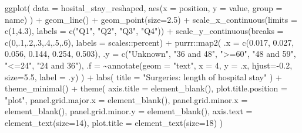 \documentclass[
  letterpaper,
  DIV=11,
  numbers=noendperiod]{scrartcl}
\newenvironment{Shaded}{\begin{snugshade}}{\end{snugshade}}
\newcommand{\AttributeTok}[1]{\textcolor[rgb]{0.40,0.45,0.13}{#1}}
\newcommand{\DecValTok}[1]{\textcolor[rgb]{0.68,0.00,0.00}{#1}}
\newcommand{\FloatTok}[1]{\textcolor[rgb]{0.68,0.00,0.00}{#1}}
\newcommand{\FunctionTok}[1]{\textcolor[rgb]{0.28,0.35,0.67}{#1}}
\newcommand{\NormalTok}[1]{\textcolor[rgb]{0.00,0.23,0.31}{#1}}
\newcommand{\SpecialCharTok}[1]{\textcolor[rgb]{0.37,0.37,0.37}{#1}}
\newcommand{\StringTok}[1]{\textcolor[rgb]{0.13,0.47,0.30}{#1}}
\begin{document}
\begin{Shaded}
\begin{Highlighting}[]
\FunctionTok{ggplot}\NormalTok{(}
  \AttributeTok{data =}\NormalTok{ hosital\_stay\_reshaped,}
  \FunctionTok{aes}\NormalTok{(}\AttributeTok{x =}\NormalTok{ position, }\AttributeTok{y =}\NormalTok{ value, }\AttributeTok{group =}\NormalTok{ name)}
\NormalTok{) }\SpecialCharTok{+}
  \FunctionTok{geom\_line}\NormalTok{() }\SpecialCharTok{+}
  \FunctionTok{geom\_point}\NormalTok{(}\AttributeTok{size=}\FloatTok{2.5}\NormalTok{) }\SpecialCharTok{+}
  \FunctionTok{scale\_x\_continuous}\NormalTok{(}\AttributeTok{limits =} \FunctionTok{c}\NormalTok{(}\DecValTok{1}\NormalTok{,}\FloatTok{4.3}\NormalTok{), }\AttributeTok{labels =} \FunctionTok{c}\NormalTok{(}\StringTok{"Q1"}\NormalTok{, }\StringTok{"Q2"}\NormalTok{, }\StringTok{"Q3"}\NormalTok{, }\StringTok{"Q4"}\NormalTok{)) }\SpecialCharTok{+}
  \FunctionTok{scale\_y\_continuous}\NormalTok{(}\AttributeTok{breaks =} \FunctionTok{c}\NormalTok{(}\DecValTok{0}\NormalTok{,.}\DecValTok{1}\NormalTok{,.}\DecValTok{2}\NormalTok{,.}\DecValTok{3}\NormalTok{,.}\DecValTok{4}\NormalTok{,.}\DecValTok{5}\NormalTok{,.}\DecValTok{6}\NormalTok{), }\AttributeTok{labels =}\NormalTok{ scales}\SpecialCharTok{::}\NormalTok{percent) }\SpecialCharTok{+}
\NormalTok{  purrr}\SpecialCharTok{::}\FunctionTok{map2}\NormalTok{(}
    \AttributeTok{.x =} \FunctionTok{c}\NormalTok{(}\FloatTok{0.017}\NormalTok{, }\FloatTok{0.027}\NormalTok{, }\FloatTok{0.056}\NormalTok{, }\FloatTok{0.144}\NormalTok{, }\FloatTok{0.254}\NormalTok{, }\FloatTok{0.503}\NormalTok{),}
    \AttributeTok{.y =} \FunctionTok{c}\NormalTok{(}\StringTok{"Unknown"}\NormalTok{, }\StringTok{"36 and 48"}\NormalTok{, }\StringTok{"\textgreater{}=60"}\NormalTok{, }\StringTok{"48 and 59"}\NormalTok{, }\StringTok{"\textless{}=24"}\NormalTok{, }\StringTok{"24 and 36"}\NormalTok{),}
    \AttributeTok{.f =} \SpecialCharTok{\textasciitilde{}}\FunctionTok{annotate}\NormalTok{(}\AttributeTok{geom =} \StringTok{"text"}\NormalTok{, }\AttributeTok{x =} \DecValTok{4}\NormalTok{, }\AttributeTok{y =}\NormalTok{ .x, }\AttributeTok{hjust=}\SpecialCharTok{{-}}\FloatTok{0.2}\NormalTok{, }\AttributeTok{size=}\FloatTok{5.5}\NormalTok{, }\AttributeTok{label =}\NormalTok{ .y)}
\NormalTok{  ) }\SpecialCharTok{+}
  \FunctionTok{labs}\NormalTok{(}
    \AttributeTok{title =} \StringTok{"Surgeries: length of hospital stay"}
\NormalTok{  ) }\SpecialCharTok{+}
  \FunctionTok{theme\_minimal}\NormalTok{() }\SpecialCharTok{+}
  \FunctionTok{theme}\NormalTok{(}
    \AttributeTok{axis.title =} \FunctionTok{element\_blank}\NormalTok{(),}
    \AttributeTok{plot.title.position =} \StringTok{"plot"}\NormalTok{,}
    \AttributeTok{panel.grid.major.x =} \FunctionTok{element\_blank}\NormalTok{(),}
    \AttributeTok{panel.grid.minor.x =} \FunctionTok{element\_blank}\NormalTok{(),}
    \AttributeTok{panel.grid.minor.y =} \FunctionTok{element\_blank}\NormalTok{(),}
    \AttributeTok{axis.text =} \FunctionTok{element\_text}\NormalTok{(}\AttributeTok{size=}\DecValTok{14}\NormalTok{),}
    \AttributeTok{plot.title =} \FunctionTok{element\_text}\NormalTok{(}\AttributeTok{size=}\DecValTok{18}\NormalTok{)}
\NormalTok{  )}
\end{Highlighting}
\end{Shaded}
\end{document}
